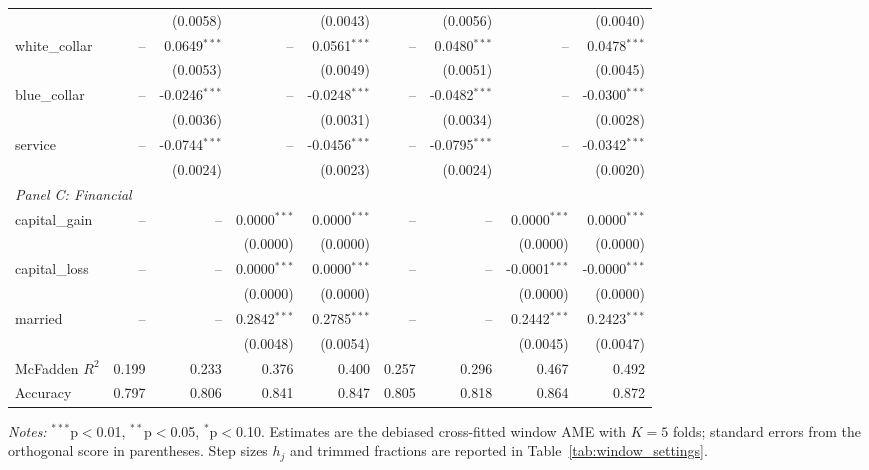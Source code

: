 \documentclass[12pt]{article}
\begin{document}
\begin{table}[htbp]
{\begin{threeparttable}
\begin{tabular}{lrrrrrrrr}
				&  & (0.0058) &  & (0.0043) &  & (0.0056) &  & (0.0040) \\
				\quad white\_collar & -- & 0.0649$^{***}$ & -- & 0.0561$^{***}$ & -- & 0.0480$^{***}$ & -- & 0.0478$^{***}$ \\
				&  & (0.0053) &  & (0.0049) &  & (0.0051) &  & (0.0045) \\
				\quad blue\_collar & -- & -0.0246$^{***}$ & -- & -0.0248$^{***}$ & -- & -0.0482$^{***}$ & -- & -0.0300$^{***}$ \\
				&  & (0.0036) &  & (0.0031) &  & (0.0034) &  & (0.0028) \\
				\quad service & -- & -0.0744$^{***}$ & -- & -0.0456$^{***}$ & -- & -0.0795$^{***}$ & -- & -0.0342$^{***}$ \\
				&  & (0.0024) &  & (0.0023) &  & (0.0024) &  & (0.0020) \\
				\midrule
				\multicolumn{9}{l}{\textit{Panel C: Financial}} \\
				\quad capital\_gain & -- & -- & 0.0000$^{***}$ & 0.0000$^{***}$ & -- & -- & 0.0000$^{***}$ & 0.0000$^{***}$ \\
				&  &  & (0.0000) & (0.0000) &  &  & (0.0000) & (0.0000) \\
				\quad capital\_loss & -- & -- & 0.0000$^{***}$ & 0.0000$^{***}$ & -- & -- & -0.0001$^{***}$ & -0.0000$^{***}$ \\
				&  &  & (0.0000) & (0.0000) &  &  & (0.0000) & (0.0000) \\
				\quad married & -- & -- & 0.2842$^{***}$ & 0.2785$^{***}$ & -- & -- & 0.2442$^{***}$ & 0.2423$^{***}$ \\
				&  &  & (0.0048) & (0.0054) &  &  & (0.0045) & (0.0047) \\
				\midrule
				McFadden $R^2$ & 0.199 & 0.233 & 0.376 & 0.400 & 0.257 & 0.296 & 0.467 & 0.492 \\
				Accuracy & 0.797 & 0.806 & 0.841 & 0.847 & 0.805 & 0.818 & 0.864 & 0.872 \\
				\bottomrule
				\end{tabular}
				\begin{tablenotes}
				\footnotesize
				\item \textit{Notes:} $^{***}$p$<$0.01, $^{**}$p$<$0.05, $^{*}$p$<$0.10. Estimates are the debiased cross-fitted window AME with $K=5$ folds; standard errors from the orthogonal score in parentheses. Step sizes $h_j$ and trimmed fractions are reported in Table~\ref{tab:window_settings}.
				\end{tablenotes}
		\end{threeparttable}
		}%
	\end{table}
	
\end{document}
